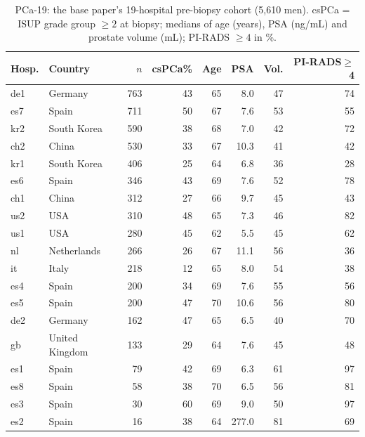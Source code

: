 \begin{table}[t]
\caption{PCa-19: the base paper's 19-hospital pre-biopsy cohort (5{,}610 men). csPCa = ISUP grade group $\geq 2$ at biopsy; medians of age (years), PSA (ng/mL) and prostate volume (mL); PI-RADS $\geq 4$ in \%.}
\centering\scriptsize
\setlength{\tabcolsep}{3pt}
\begin{tabular}{llrrrrrr}
\toprule
Hosp. & Country & $n$ & csPCa\% & Age & PSA & Vol. & PI-RADS$\geq$4 \\
\midrule
de1 & Germany & 763 & 43 & 65 & 8.0 & 47 & 74 \\
es7 & Spain & 711 & 50 & 67 & 7.6 & 53 & 55 \\
kr2 & South Korea & 590 & 38 & 68 & 7.0 & 42 & 72 \\
ch2 & China & 530 & 33 & 67 & 10.3 & 41 & 42 \\
kr1 & South Korea & 406 & 25 & 64 & 6.8 & 36 & 28 \\
es6 & Spain & 346 & 43 & 69 & 7.6 & 52 & 78 \\
ch1 & China & 312 & 27 & 66 & 9.7 & 45 & 43 \\
us2 & USA & 310 & 48 & 65 & 7.3 & 46 & 82 \\
us1 & USA & 280 & 45 & 62 & 5.5 & 45 & 62 \\
nl & Netherlands & 266 & 26 & 67 & 11.1 & 56 & 36 \\
it & Italy & 218 & 12 & 65 & 8.0 & 54 & 38 \\
es4 & Spain & 200 & 34 & 69 & 7.6 & 55 & 56 \\
es5 & Spain & 200 & 47 & 70 & 10.6 & 56 & 80 \\
de2 & Germany & 162 & 47 & 65 & 6.5 & 40 & 70 \\
gb & United Kingdom & 133 & 29 & 64 & 7.6 & 45 & 48 \\
es1 & Spain & 79 & 42 & 69 & 6.3 & 61 & 97 \\
es8 & Spain & 58 & 38 & 70 & 6.5 & 56 & 81 \\
es3 & Spain & 30 & 60 & 69 & 9.0 & 50 & 97 \\
es2 & Spain & 16 & 38 & 64 & 277.0 & 81 & 69 \\
\bottomrule
\end{tabular}
\label{tab:pca19_cohort}
\end{table}
